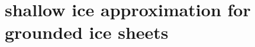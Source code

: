 \documentclass{beamer}
\begin{document}

\section[shallow ice approximation]{shallow ice approximation for grounded ice sheets}
\end{document}
